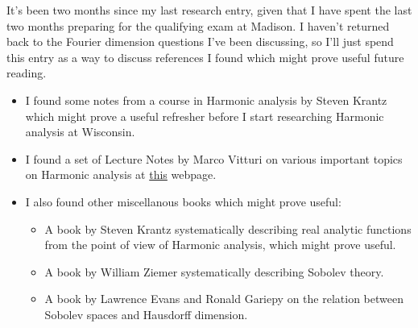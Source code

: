 \documentclass[openany,nobib,nols,a4paper,twoside,symmetric,justified,notoc]{tufte-book}
\theoremstyle{plain}
\theoremstyle{remark}
\theoremstyle{definition}
\begin{document}
It's been two months since my last research entry, given that I have spent the last two months preparing for the qualifying exam at Madison. I haven't returned back to the Fourier dimension questions I've been discussing, so I'll just spend this entry as a way to discuss references I found which might prove useful future reading.
%
\begin{itemize}
    \item I found some notes \cite{Krantz2007} from a course in Harmonic analysis by Steven Krantz which might prove a useful refresher before I start researching Harmonic analysis at Wisconsin.

    \item I found a set of Lecture Notes by Marco Vitturi on various important topics on Harmonic analysis at \href{https://www.math.sciences.univ-nantes.fr/~vitturi/lecture_notes/lecture_notes.html}{this} webpage.

    \item I also found other miscellanous books which might prove useful:
    \begin{itemize}
        \item A book by Steven Krantz \cite{Krantz2002} systematically describing real analytic functions from the point of view of Harmonic analysis, which might prove useful.

        \item A book \cite{Ziemer1989} by William Ziemer systematically describing Sobolev theory.

        \item A book \cite{Evans1992} by Lawrence Evans and Ronald Gariepy on the relation between Sobolev spaces and Hausdorff dimension.
    \end{itemize}
\end{itemize}








\end{document}
